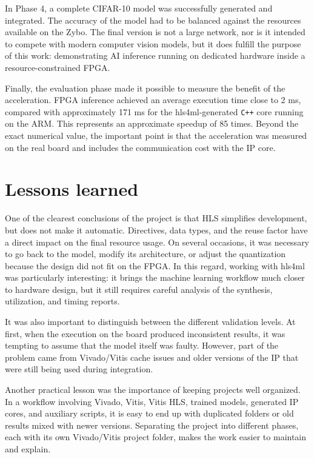 In Phase 4, a complete \ac{CIFAR}-10 model was successfully generated and integrated. The
accuracy of the model had to be balanced against the resources available on the Zybo.
The final version is not a large network, nor is it intended to compete with modern
computer vision models, but it does fulfill the purpose of this work: demonstrating AI
inference running on dedicated hardware inside a resource-constrained \ac{FPGA}.

Finally, the evaluation phase made it possible to measure the benefit of the
acceleration. \ac{FPGA} inference achieved an average execution time close to 2 ms, compared
with approximately 171 ms for the hls4ml-generated \texttt{C++} core running on the \ac{ARM}. This
represents an approximate speedup of 85 times. Beyond the exact numerical value, the
important point is that the acceleration was measured on the real board and includes the
communication cost with the \ac{IP} core.

\section*{Lessons learned}
One of the clearest conclusions of the project is that \ac{HLS} simplifies development, but
does not make it automatic. Directives, data types, and the reuse factor have a direct
impact on the final resource usage. On several occasions, it was necessary to go back to
the model, modify its architecture, or adjust the quantization because the design did not
fit on the \ac{FPGA}. In this regard, working with hls4ml was particularly interesting: it
brings the machine learning workflow much closer to hardware design, but it still
requires careful analysis of the synthesis, utilization, and timing reports.

It was also important to distinguish between the different validation levels. At first,
when the execution on the board produced inconsistent results, it was tempting to assume
that the model itself was faulty. However, part of the problem came from Vivado/Vitis
cache issues and older versions of the \ac{IP} that were still being used during integration.

Another practical lesson was the importance of keeping projects well organized. In a
workflow involving Vivado, Vitis, Vitis \ac{HLS}, trained models, generated \ac{IP} cores, and
auxiliary scripts, it is easy to end up with duplicated folders or old results mixed
with newer versions. Separating the project into different phases, each with its own
Vivado/Vitis project folder, makes the work easier to maintain and explain.

